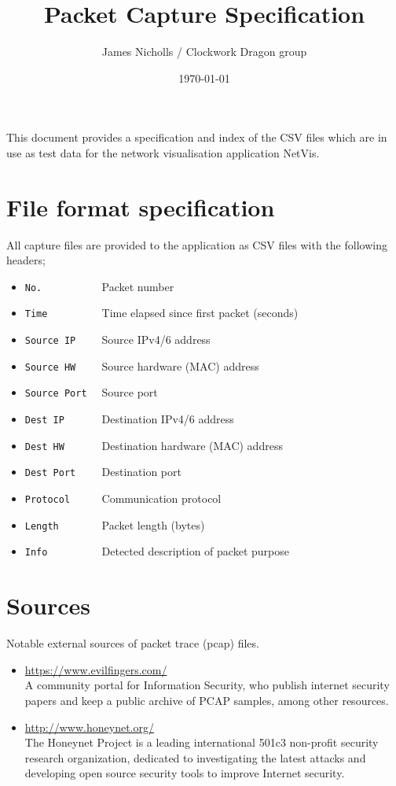 \documentclass[12pt,a4paper]{article}
\author{James Nicholls / Clockwork Dragon group}
\title{Packet Capture Specification}
\date{\today}
\begin{document}
    \maketitle

    This document provides a specification and index of the CSV files
    which are in use as test data for the network visualisation
    application NetVis.

    \section{File format specification}
        All capture files are provided to the application as CSV files
        with the following headers;

    \begin{itemize}
    \setlength{\itemsep}{0pt}
        \item \verb!No.          ! Packet number
        \item \verb!Time         ! Time elapsed since first packet (seconds)
        \item \verb!Source IP    ! Source IPv4/6 address
        \item \verb!Source HW    ! Source hardware (MAC) address
        \item \verb!Source Port  ! Source port
        \item \verb!Dest IP      ! Destination IPv4/6 address
        \item \verb!Dest HW      ! Destination hardware (MAC) address
        \item \verb!Dest Port    ! Destination port
        \item \verb!Protocol     ! Communication protocol
        \item \verb!Length       ! Packet length (bytes)
        \item \verb!Info         ! Detected description of packet purpose
    \end{itemize}

    \section{Sources}

    Notable external sources of packet trace (pcap) files.

    \begin{itemize}
        \item \url{https://www.evilfingers.com/} \\
            A community portal for Information Security, who publish
            internet security papers and keep a public archive of
            PCAP samples, among other resources.

        \item \url{http://www.honeynet.org/} \\
            The Honeynet Project is a leading international 501c3
            non-profit security research organization, dedicated to
            investigating the latest attacks and developing open source
            security tools to improve Internet security.
    \end{itemize}
\end{document}

